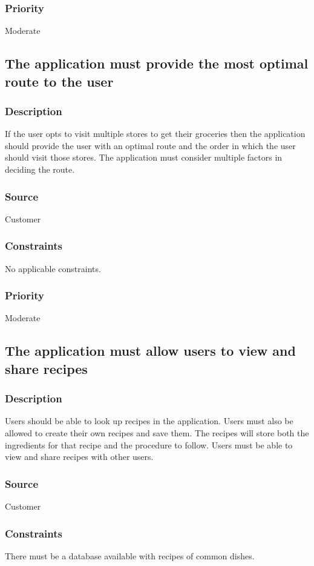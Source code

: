 \subsubsection{Priority}
Moderate\\

\subsection{The application must provide the most optimal route to the user}
\subsubsection{Description}
If the user opts to visit multiple stores to get their groceries then the application should provide the user with an optimal route and the order in which the user should visit those stores. The application must consider multiple factors in deciding the route. 
\subsubsection{Source}
Customer
\subsubsection{Constraints}
No applicable constraints.
\subsubsection{Priority}
Moderate\\

\subsection{The application must allow users to view and share recipes}
\subsubsection{Description}
Users should be able to look up recipes in the application. Users must also be allowed to create their own recipes and save them. The recipes will store both the ingredients for that recipe and the procedure to follow. Users must be able to view and share recipes with other users.
\subsubsection{Source}
Customer
\subsubsection{Constraints}
There must be a database available with recipes of common dishes.
